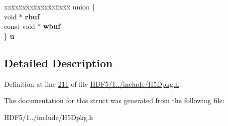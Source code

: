 \begin{DoxyCompactItemize}
\begin{tabbing}
\end{tabbing}\item 
\mbox{\label{struct_h5_d__io__info__t_aa2a9cf0c77a5b02657eb52d449abf74d}} 
\begin{tabbing}
xx\=xx\=xx\=xx\=xx\=xx\=xx\=xx\=xx\=\kill
union \{\\
\>void $\ast$ {\bfseries rbuf}\\
\>const void $\ast$ {\bfseries wbuf}\\
\} {\bfseries u}\\

\end{tabbing}\end{DoxyCompactItemize}


\subsection{Detailed Description}


Definition at line \hyperlink{_h_d_f5_21_810_81_2include_2_h5_dpkg_8h_source_l00211}{211} of file \hyperlink{_h_d_f5_21_810_81_2include_2_h5_dpkg_8h_source}{H\+D\+F5/1../include/\+H5\+Dpkg.\+h}.



The documentation for this struct was generated from the following file\+:\begin{DoxyCompactItemize}
\item 
H\+D\+F5/1../include/\+H5\+Dpkg.\+h\end{DoxyCompactItemize}
